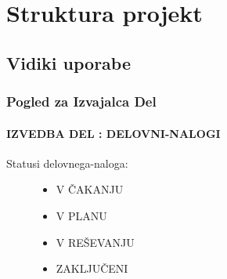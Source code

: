 \documentclass[letterpaper,10pt,english]{sphinxmanual}
\begin{document}
\chapter{Struktura projekt}
\label{struktura::doc}\label{struktura:owasp-zap}\label{struktura:struktura-projekt}

\section{Vidiki uporabe}
\label{struktura:vidiki-uporabe}

\subsection{Pogled za Izvajalca Del}
\label{view_za_izvajalca::doc}\label{view_za_izvajalca:pogled-za-izvajalca-del}

\subsubsection{IZVEDBA DEL : DELOVNI-NALOGI}
\label{view_za_izvajalca:izvedba-del-delovni-nalogi}\begin{description}
\item[{Statusi delovnega-naloga:}] \leavevmode\begin{itemize}
\item {} 
V ČAKANJU

\item {} 
V PLANU

\item {} 
V REŠEVANJU

\item {} 
ZAKLJUČENI

\end{itemize}

\end{description}
\end{document}
